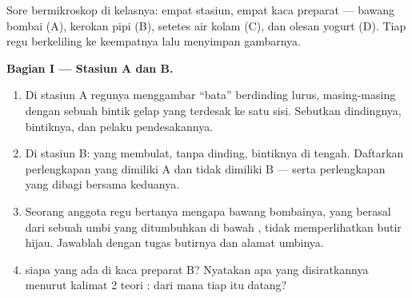 \begin{problem}\label{pb:g6:cell-unit-of-life:1}
Sore bermikroskop di kelasnya: empat stasiun, empat kaca preparat ---
 bawang bombai (A), kerokan pipi (B), setetes air kolam (C), dan
olesan yogurt (D). Tiap regu berkeliling ke keempatnya lalu menyimpan
gambarnya.

\medskip\noindent\textbf{Bagian I --- Stasiun A dan B.}
\begin{enumerate}
  \item Di stasiun A regunya menggambar ``bata'' berdinding lurus,
        masing-masing dengan sebuah bintik gelap yang terdesak ke satu
        sisi. Sebutkan dindingnya, bintiknya, dan pelaku pendesakannya.
  \item Di stasiun B:  yang membulat, tanpa dinding, bintiknya di
        tengah. Daftarkan perlengkapan yang dimiliki  A dan tidak
        dimiliki  B --- serta perlengkapan yang dibagi bersama
        keduanya.
  \item Seorang anggota regu bertanya mengapa  bawang bombainya,
        yang berasal dari sebuah umbi yang ditumbuhkan di bawah ,
        tidak memperlihatkan butir hijau. Jawablah dengan tugas
        butirnya dan alamat umbinya.
  \item {} siapa yang ada di kaca preparat B? Nyatakan apa yang
        disiratkannya menurut kalimat 2 teori : dari mana tiap
         itu datang?
\end{enumerate}


\end{problem}
